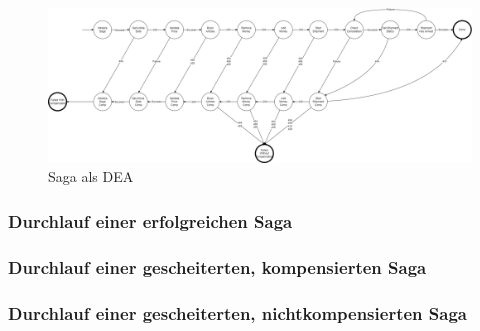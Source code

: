 \begin{figure}[h!]
	\centering
	\includegraphics[width=\linewidth]{figures/DatabaseER/DEA_No_NetworkErrors_No_Retries.png}
	\caption{Saga als DEA}
\end{figure}
\FloatBarrier

\subsubsection{Durchlauf einer erfolgreichen Saga}

\subsubsection{Durchlauf einer gescheiterten, kompensierten Saga}

\subsubsection{Durchlauf einer gescheiterten, nichtkompensierten Saga}

\section{}